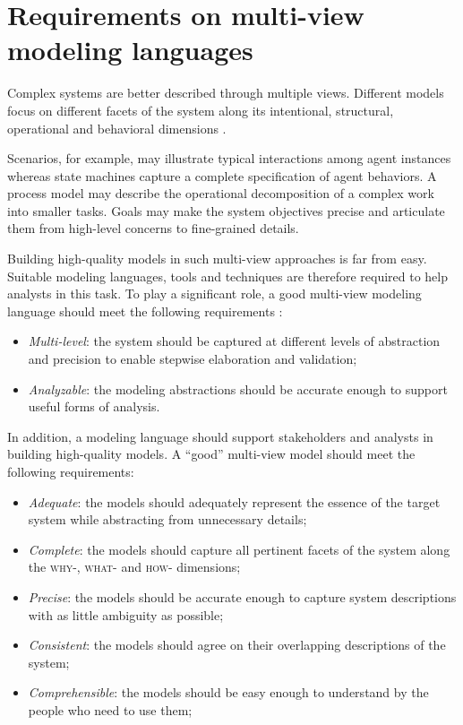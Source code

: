 \section{Requirements on multi-view modeling languages\label{section:intro-requirements}}

Complex systems are better described through multiple views. Different models focus on different facets of the system along its intentional, structural, operational and behavioral dimensions \cite{VanLamsweerde:2009}. 

Scenarios, for example, may illustrate typical interactions among agent instances whereas state machines capture a complete specification of agent behaviors. A process model may describe the operational decomposition of a complex work into smaller tasks. Goals may make the system objectives precise and articulate them from high-level concerns to fine-grained details.

Building high-quality models in such multi-view approaches is far from easy. Suitable modeling languages, tools and techniques are therefore required to help analysts in this task. To play a significant role, a good multi-view modeling language should meet the following requirements \cite{VanLamsweerde:2009}:

\begin{itemize}
\item \emph{Multi-level}: the system should be captured at different levels of abstraction and precision to enable stepwise elaboration and validation;
\item \emph{Analyzable}: the modeling abstractions should be accurate enough to support useful forms of analysis.
\end{itemize}

In addition, a modeling language should support stakeholders and analysts in building high-quality models. A ``good'' multi-view model should meet the following requirements:

\begin{itemize}
\item \emph{Adequate}: the models should adequately represent the essence of the target system while abstracting from unnecessary details;
\item \emph{Complete}: the models should capture all pertinent facets of the system along the \textsc{why-}, \textsc{what-} and \textsc{how-} dimensions;
\item \emph{Precise}: the models should be accurate enough to capture system descriptions with as little ambiguity as possible;
\item \emph{Consistent}: the models should agree on their overlapping descriptions of the system;
\item \emph{Comprehensible}: the models should be easy enough to understand by the people who need to use them;
\end{itemize}

